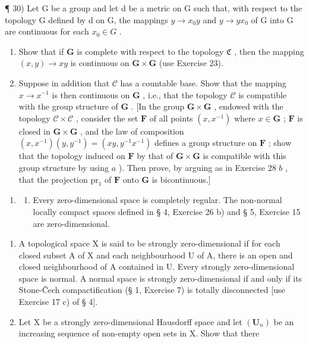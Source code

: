 ¶ 30) Let G be a group and let d be a metric on G such that, with respect to the topology G defined by d on G, the mappings \(y \to x_{0}y\) and \(y \to yx_{0}\) of G into G are continuous for each \(x_{0} \in G\) .

\begin{enumerate}
\def\labelenumi{\alph{enumi})}
\item
  Show that if \(\mathbf{G}\) is complete with respect to the topology \(\mathfrak{C}\) , then the mapping \((x,y)\to xy\) is continuous on \(\mathbf{G}\times\mathbf{G}\) (use Exercise 23).
\item
  Suppose in addition that \(\mathcal{C}\) has a countable base. Show that the mapping \(x \to x^{-1}\) is then continuous on \(\mathbf{G}\) , i.e., that the topology \(\mathcal{C}\) is compatible with the group structure of \(\mathbf{G}\) . {[}In the group \(\mathbf{G} \times \mathbf{G}\) , endowed with the topology \(\mathcal{C} \times \mathcal{C}\) , consider the set \(\mathbf{F}\) of all points \((x, x^{-1})\) where \(x \in \mathbf{G}\) ; \(\mathbf{F}\) is closed in \(\mathbf{G} \times \mathbf{G}\) , and the law of composition \((x, x^{-1})(y, y^{-1}) = (xy, y^{-1}x^{-1})\) defines a group structure on \(\mathbf{F}\) ; show that the topology induced on \(\mathbf{F}\) by that of \(\mathbf{G} \times \mathbf{G}\) is compatible with this group structure by using \(a\) ). Then prove, by arguing as in Exercise 28 \(b\) , that the projection \(\mathrm{pr}_1\) of \(\mathbf{F}\) onto \(\mathbf{G}\) is bicontinuous.{]}
\end{enumerate}

\ExerciseSection

\begin{enumerate}
\def\labelenumi{\arabic{enumi})}
\tightlist
\item
  \begin{enumerate}
  \def\labelenumii{\alph{enumii})}
  \tightlist
  \item
    Every zero-dimensional space is completely regular. The non-normal locally compact spaces defined in § 4, Exercise 26 b) and § 5, Exercise 15 are zero-dimensional.
  \end{enumerate}
\end{enumerate}

\begin{enumerate}
\def\labelenumi{\alph{enumi})}
\setcounter{enumi}{1}
\item
  A topological space X is said to be strongly zero-dimensional if for each closed subset A of X and each neighbourhood U of A, there is an open and closed neighbourhood of A contained in U. Every strongly zero-dimensional space is normal. A normal space is strongly zero-dimensional if and only if its Stone-Čech compactification (§ 1, Exercise 7) is totally disconnected {[}use Exercise 17 c) of § 4{]}.
\item
  Let X be a strongly zero-dimensional Hausdorff space and let \((\mathbf{U}_{n})\) be an increasing sequence of non-empty open sets in X. Show that there
\end{enumerate}

